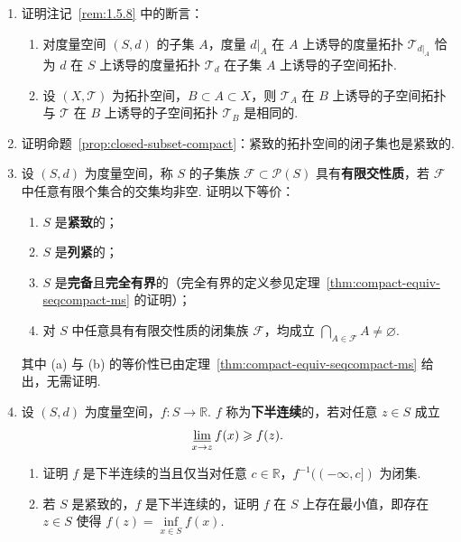 \documentclass[../main.tex]{subfiles}
\begin{document}
\begin{enumerate}
    \item 证明注记~\ref{rem:1.5.8} 中的断言：
    \begin{enumerate}
        \item 对度量空间 $(S, d)$ 的子集 $A$，度量 $d|_A$ 在 $A$ 上诱导的度量拓扑 $\mathcal{T}_{d|_A}$ 恰为 $d$ 在 $S$ 上诱导的度量拓扑 $\mathcal{T}_{d}$ 在子集 $A$ 上诱导的子空间拓扑. 

        \item 设 $(X, \mathcal{T})$ 为拓扑空间，$B \subset A \subset X$，则 $\mathcal{T}_A$ 在 $B$ 上诱导的子空间拓扑与 $\mathcal{T}$ 在 $B$ 上诱导的子空间拓扑 $\mathcal{T}_B$ 是相同的. 
    \end{enumerate}

    \item 证明命题~\ref{prop:closed-subset-compact}：紧致的拓扑空间的闭子集也是紧致的. 
    
    \item 设 $(S, d)$ 为度量空间，称 $S$ 的子集族 $\mathcal{F} \subset \mathcal{P}(S)$ 具有\textbf{有限交性质}，若 $\mathcal{F}$ 中任意有限个集合的交集均非空. 证明以下等价：
    \begin{enumerate}
        \item $S$ 是\textbf{紧致}的；
        \item $S$ 是\textbf{列紧}的；
        \item $S$ 是\textbf{完备}且\textbf{完全有界}的（完全有界的定义参见定理~\ref{thm:compact-equiv-seqcompact-ms} 的证明）；
        \item 对 $S$ 中任意具有有限交性质的闭集族 $\mathcal{F}$，均成立 $\bigcap\limits_{A \in \mathcal{F}} A \neq \varnothing$. 
    \end{enumerate}
    其中 (a) 与 (b) 的等价性已由定理~\ref{thm:compact-equiv-seqcompact-ms} 给出，无需证明. 

    \item 设 $(S, d)$ 为度量空间，$f:S \to \mathbb R$. $f$ 称为\textbf{下半连续}的，若对任意 $z \in S$ 成立 
    $$
    \varliminf_{x \to z} f(x) \geqslant f(z). 
    $$
    \begin{enumerate}
        \item 证明 $f$ 是下半连续的当且仅当对任意 $c \in \mathbb R$，$f^{-1}((-\infty, c])$ 为闭集. 

        \item 若 $S$ 是紧致的，$f$ 是下半连续的，证明 $f$ 在 $S$ 上存在最小值，即存在 $z \in S$ 使得 $f(z) = \inf\limits_{x \in S} f(x)$. 
    \end{enumerate}

\end{enumerate}
\end{document}
